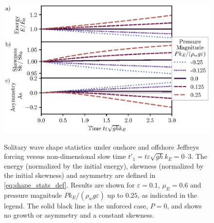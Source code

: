 \documentclass{jfm}
\renewcommand*{\epsilon}{\varepsilon}
\begin{document}
\begin{figure}
  \centering
  { %
    \label{fig:statistics_solitary:a}
    \label{fig:statistics_solitary:b}
    \label{fig:statistics_solitary:c}
  }
  \includegraphics{Skew-Asymm-Production.eps}
  \vspace{-0.25cm}
  \caption{
    Solitary wave shape statistics under onshore and offshore
    Jeffreys forcing versus non-dimensional slow time $t'_1 = t
    \epsilon \sqrt{gh} k_E = \numrange{0}{3}$.
    The
    energy (normalized by the initial energy),
    skewness (normalized by the initial skewness) and
    asymmetry are defined in
    \cref{eq:shape_stats_def}.
    Results are shown for $\epsilon=0.1$, $\mu_E = 0.6$ and pressure
    magnitude $P k_E/(\rho_w g \epsilon)$ up to $0.25$, as indicated in
    the legend.
    The solid black line is the unforced case, $P = 0$, and
    shows no growth or asymmetry and a constant skewness.
  }\label{fig:statistics_solitary}
\end{figure}
\end{document}
